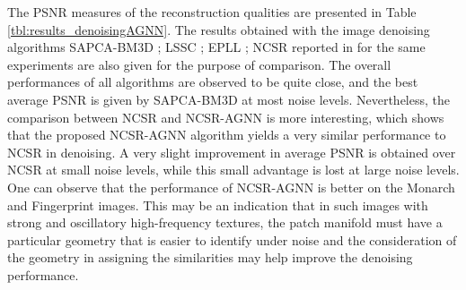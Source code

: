 \documentclass[journal]{IEEEtran}
\begin{document}
The PSNR measures of the reconstruction qualities are presented in Table \ref{tbl:results_denoisingAGNN}. The results obtained with the image denoising algorithms SAPCA-BM3D \cite{Katkovnik10from}; LSSC \cite{Mairal09non}; EPLL \cite{Zoran11from}; NCSR \cite{Dong13nonlocally} reported in \cite{Dong13nonlocally} for the same experiments are also given for the purpose of comparison. The overall performances of all algorithms are observed to be quite close, and the best average PSNR is given by SAPCA-BM3D at most noise levels. Nevertheless, the comparison between NCSR and NCSR-AGNN is more interesting, which shows that the proposed NCSR-AGNN algorithm yields a very similar performance to NCSR in denoising. A very slight improvement in average PSNR is obtained over NCSR at small noise levels, while this small advantage is lost at large noise levels. %
One can observe that the performance of NCSR-AGNN is better on the Monarch and Fingerprint images. This may be an indication that in such images with strong and oscillatory high-frequency textures, the patch manifold must have a particular geometry that is easier to identify under noise and the consideration of the geometry in assigning the similarities may help improve the denoising performance.


\end{document}
